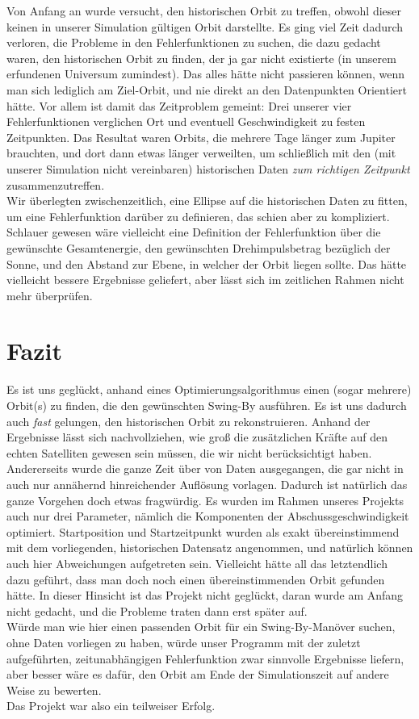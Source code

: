 Von Anfang an wurde versucht, den historischen Orbit zu treffen, obwohl dieser keinen in unserer Simulation gültigen Orbit darstellte. Es ging viel Zeit dadurch verloren, die Probleme in den Fehlerfunktionen zu suchen, die dazu gedacht waren, den historischen Orbit zu finden, der ja gar nicht existierte (in unserem erfundenen Universum zumindest). Das alles hätte nicht passieren können, wenn man sich lediglich am Ziel-Orbit, und nie direkt an den Datenpunkten Orientiert hätte. Vor allem ist damit das Zeitproblem gemeint: Drei unserer vier Fehlerfunktionen verglichen Ort und eventuell Geschwindigkeit zu festen Zeitpunkten. Das Resultat waren Orbits, die mehrere Tage länger zum Jupiter brauchten, und dort dann etwas länger verweilten, um schließlich mit den (mit unserer Simulation nicht vereinbaren) historischen Daten \textit{zum richtigen Zeitpunkt} zusammenzutreffen. \\
Wir überlegten zwischenzeitlich, eine Ellipse auf die historischen Daten zu fitten, um eine Fehlerfunktion darüber zu definieren, das schien aber zu kompliziert. Schlauer gewesen wäre vielleicht eine Definition der Fehlerfunktion über die gewünschte Gesamtenergie, den gewünschten Drehimpulsbetrag bezüglich der Sonne, und den Abstand zur Ebene, in welcher der Orbit liegen sollte. Das hätte vielleicht bessere Ergebnisse geliefert, aber lässt sich im zeitlichen Rahmen nicht mehr überprüfen. 



\section{Fazit}

Es ist uns geglückt, anhand eines Optimierungsalgorithmus einen (sogar mehrere) Orbit(s) zu finden, die den gewünschten Swing-By ausführen. Es ist uns dadurch auch \textit{fast} gelungen, den historischen Orbit zu rekonstruieren. Anhand der Ergebnisse lässt sich nachvollziehen, wie groß die zusätzlichen Kräfte auf den echten Satelliten gewesen sein müssen, die wir nicht berücksichtigt haben. \\
Andererseits wurde die ganze Zeit über von Daten ausgegangen, die gar nicht in auch nur annähernd hinreichender Auflösung vorlagen. Dadurch ist natürlich das ganze Vorgehen doch etwas fragwürdig. Es wurden im Rahmen unseres Projekts auch nur drei Parameter, nämlich die Komponenten der Abschussgeschwindigkeit optimiert. Startposition und Startzeitpunkt wurden als exakt übereinstimmend mit dem vorliegenden, historischen Datensatz angenommen, und natürlich können auch hier Abweichungen aufgetreten sein. Vielleicht hätte all das letztendlich dazu geführt, dass man doch noch einen übereinstimmenden Orbit gefunden hätte. In dieser Hinsicht ist das Projekt nicht geglückt, daran wurde am Anfang nicht gedacht, und die Probleme traten dann erst später auf.\\
Würde man wie hier einen passenden Orbit für ein Swing-By-Manöver suchen, ohne Daten vorliegen zu haben, würde unser Programm mit der zuletzt aufgeführten, zeitunabhängigen Fehlerfunktion zwar sinnvolle Ergebnisse liefern, aber besser wäre es dafür, den Orbit am Ende der Simulationszeit auf andere Weise zu bewerten.\\
Das Projekt war also ein teilweiser Erfolg.


